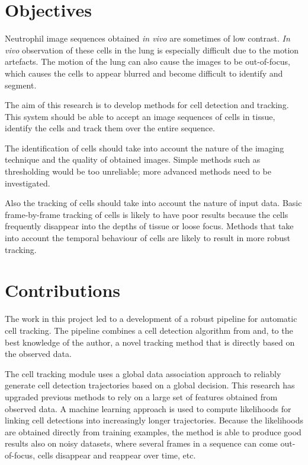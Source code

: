 	\section{Objectives \statusfirstdraft}
		
		Neutrophil image sequences obtained \textit{in vivo} are sometimes of low contrast. \textit{In vivo} observation of these cells in the lung is especially difficult due to the motion artefacts. The motion of the lung can also cause the images to be out-of-focus, which causes the cells to appear blurred and become difficult to identify and segment.
		
		The aim of this research is to develop methods for cell detection and tracking. This system should be able to accept an image sequences of cells in tissue, identify the cells and track them over the entire sequence.
		
		The identification of cells should take into account the nature of the imaging technique and the quality of obtained images. Simple methods such as thresholding would be too unreliable; more advanced methods need to be investigated.
		
		Also the tracking of cells should take into account the nature of input data. Basic frame-by-frame tracking of cells is likely to have poor results because the cells frequently disappear into the depths of tissue or loose focus. Methods that take into account the temporal behaviour of cells are likely to result in more robust tracking.
		
	\section{Contributions \statusfirstdraft}
		
		The work in this project led to a development of a robust pipeline for automatic cell tracking. The pipeline combines a cell detection algorithm from \cite{arteta12} and, to the best knowledge of the author, a novel tracking method that is directly based on the observed data. 
		
		The cell tracking module uses a global data association approach to reliably generate cell detection trajectories based on a global decision. This research has upgraded previous methods to rely on a large set of features obtained from observed data. A machine learning approach is used to compute likelihoods for linking cell detections into increasingly longer trajectories. Because the likelihoods are obtained directly from training examples, the method is able to produce good results also on noisy datasets, where several frames in a sequence can come out-of-focus, cells disappear and reappear over time, etc.
		
